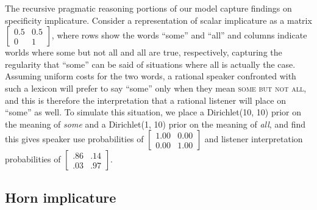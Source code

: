 \documentclass{article} %
\begin{document}
The recursive pragmatic reasoning portions of our model capture findings on specificity implicature. Consider a representation of scalar implicature as a matrix 
$\left[
    \begin{array}{cc}
      0.5 & 0.5 \\
      0 & 1
    \end{array} 
  \right]$,
where rows show the words ``some'' and ``all'' and columns indicate worlds where {\sc some but not all} and {\sc all} are true, respectively, capturing the regularity that ``some'' can be said of situations where {\sc all} is actually the case. Assuming uniform costs for the two words, a rational speaker confronted with such a lexicon will prefer to say ``some'' only when they mean \textsc{some but not all}, and this is therefore the interpretation that a rational listener will place on ``some'' as well. To simulate this situation, we place a Dirichlet(10, 10) prior on the meaning of \textit{some} and a Dirichlet(1, 10) prior on the meaning of \textit{all}, and find this gives speaker use probabilities of 
$\left[
    \begin{array}{cc}
      1.00 & 0.00 \\
      0.00 & 1.00
    \end{array} 
  \right]$
and listener interpretation probabilities of 
$\left[
    \begin{array}{cc}
      .86 & .14 \\
      .03 & .97
    \end{array} 
  \right]$.

%
%

\subsection{Horn implicature}

\label{sec:horn-implicature}

\end{document}
